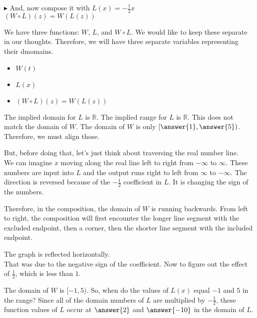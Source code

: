 \documentclass{ximera}
\begin{document}
$\blacktriangleright$ And, now compose it with $L(x) = -\frac{1}{2}x$ \\



$(W \circ L)(z) = W(L(z))$



\begin{explanation}

We have three functions: $W$, $L$, and $W \circ L$.  We would like to keep these separate in our thoughts.  Therefore, we will have three separate variables representing their dmomains.


\begin{itemize}
\item $W(t)$
\item $L(x)$
\item $(W \circ L)(z) = W(L(z))$
\end{itemize}

\end{explanation}






The implied domain for $L$ is \textbf{$\mathbb{R}$}.  The implied range for $L$ is \textbf{$\mathbb{R}$}. This does not match the domain of $W$.  The domain of $W$ is only $\left[ \answer{1}, \answer{5} \right)$. Therefore, we must align those.

But, before doing that, let's just think about traversing the real number line. \\

We can imagine $x$ moving along the real line left to right from $-\infty$ to $\infty$. These numbers are input into $L$ and the output runs right to left from $\infty$ to $-\infty$.  The direction is reversed because of the $-\frac{1}{2}$ coefficient in $L$.  It is changing the sign of the numbers.


Therefore, in the composition, the domain of $W$ is running backwards.  From left to right, the composition will first encounter the longer line segment with the excluded endpoint, then a corner, then the shorter line segment with the included endpoint.

The graph is reflected horizontally. \\


That was due to the negative sign of the coefficient.  Now to figure out the effect of $\frac{1}{2}$, which is less than $1$.


The domain of $W$ is $[-1, 5)$.  So, when do the values of $L(x)$ equal $-1$ and $5$ in the range?  Since all of the domain numbers of $L$ are multiplied by $-\frac{1}{2}$, these function values of $L$ occur at $\answer{2}$ and $\answer{-10}$ in the domain of $L$. \\
\end{document}
